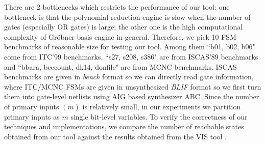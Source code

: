 There are 2 bottlenecks which restricts the performance of our tool:
one bottleneck is that the polynomial reduction engine is slow when the number of
gates (especially OR gates) is large; the other one is the high computational complexity
of Gr\"obner basis engine in general. Therefore, we pick 10 FSM
benchmarks of reasonable size for testing our tool. Among them ``b01,
b02, b06" come from ITC'99 benchmarks, %
``s27, s208, s386" are from  ISCAS'89 benchmarks %
 and ``bbara, beecount, dk14, donfile" are from MCNC benchmarks. %
ISCAS benchmarks are given in {\it bench} format so we can directly read gate information,
where ITC/MCNC FSMs are given in unsynthesized {\it BLIF} format so we first turn them
into gate-level netlists using AIG based synthesizer ABC. %
Since the number of primary inputs $(m)$ is relatively small, in our experiments we partition
primary inputs as $m$ single bit-level variables. To verify the
correctness of our techniques and implementations, we compare the
number of reachable states obtained from our tool against the results
obtained from the VIS tool \cite{brayton1996vis}. 


